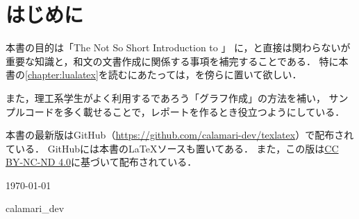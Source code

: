 \documentclass[../index]{subfiles}
\begin{document}
\chapter*{はじめに}
本書の目的は「The Not So Short Introduction to \LaTeXe 」\cite{Tobias2021}
に，\LaTeXe と直接は関わらないが重要な知識と，和文の文書作成に関係する事項を補完することである．
特に本書の\cref{chapter:lualatex}を読むにあたっては，\cite{Tobias2021}を傍らに置いて欲しい．

また，理工系学生がよく利用するであろう「グラフ作成」の方法を補い，
サンプルコードを多く載せることで，レポートを作るとき役立つようにしている．

本書の最新版はGitHub（\url{https://github.com/calamari-dev/texlatex}）で配布されている．
GitHubには本書の\LaTeX ソースも置いてある．
また，この版は\href{https://creativecommons.org/licenses/by-nc-nd/4.0/deed.ja}{CC BY-NC-ND 4.0}に基づいて配布されている．

\begin{flushright}
  \today

  calamari\_dev
\end{flushright}
\end{document}
